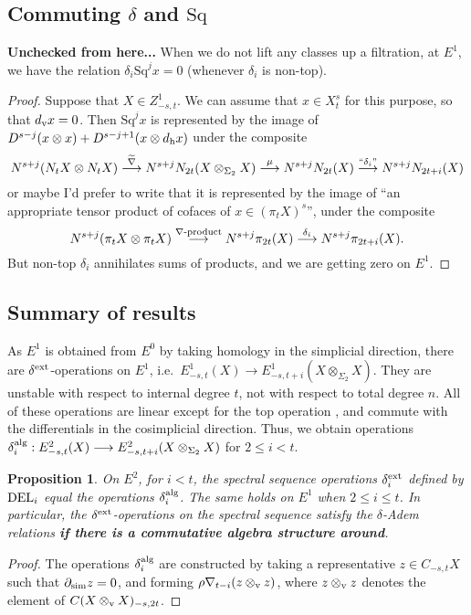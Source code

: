 \documentclass[11pt]{amsart}
\theoremstyle{plain}
\newtheorem{prop}[thm]{Proposition}
\theoremstyle{definition}
\renewcommand{\to}{\longrightarrow}
\theoremstyle{plain}
\newcommand{\Nabla}{\nabla}
\newcommand{\Sq}{\mathrm{Sq}}
\begin{document}
\begin{second quadrant homotopy}
\subsection{Commuting $\delta$ and $\Sq$}
\textbf{Unchecked from here...} 
When we do not lift any classes up a filtration, at $E^1$, we have the relation $\delta_i\Sq^jx=0$ (whenever $\delta_i$ is non-top).
\begin{proof}
Suppose that $X\in Z^1_{-s,t}$. We can assume that $x\in X^s_t$ for this purpose, so that $d_\textup{v}x=0$. Then $\Sq^jx$ is represented by the image of $D^{s-j}(x\otimes x)+D^{s-j+1}(x\otimes d_\textup{h}x)$ under the composite
\[N^{s+j}(N_tX\otimes N_tX)\overset{\widetilde{\Nabla}}{\to}N^{s+j}N_{2t}(X\otimes_{\Sigma_2} X)\overset{\mu}{\to}N^{s+j}N_{2t}(X)\overset{\textup{``$\delta_i$''}}{\to}N^{s+j}N_{2t+i}(X)\]
or maybe I'd prefer to write that it is represented by the image of ``an appropriate tensor product of cofaces of $x\in (\pi_tX)^s$'', under the composite
\[N^{s+j}(\pi_tX\otimes \pi_tX)\overset{\Nabla\textup{-product}}{\to}N^{s+j}\pi_{2t}(X)\overset{\delta_i}{\to}N^{s+j}\pi_{2t+i}(X).\]
But non-top $\delta_i$ annihilates sums of products, and we are getting zero on $E^1$.
\end{proof}

\subsection{Summary of results}

As $E^1$ is obtained from $E^0$ by taking homology in the simplicial direction, there are $\delta^\textup{ext}$-operations on $E^1$, i.e.\ $E^1_{-s,t}(X)\to E^1_{-s,t+i}(X\otimes_{\Sigma_2}X)$. They are unstable with respect to internal degree $t$, not with respect to total degree $n$. All of these operations are linear except for the top operation \cite[4.2]{DwyerHtpyOpsSimpComAlg.pdf}, and commute with the differentials in the cosimplicial direction. Thus, we obtain operations $\delta^\textup{alg}_i:E^2_{-s,t}(X)\to E^2_{-s,t+i}(X\otimes_{\Sigma_2}X)$ for $2\leq i<t$.
\begin{prop}
On $E^2$, for $i<t$, the spectral sequence operations $\delta^\textup{ext}_i$ defined by $\textup{DEL}_i$ equal the operations $\delta^\textup{alg}_i$. The same holds on $E^1$ when $2\leq i\leq t$. In particular, the $\delta^\textup{ext}$-operations on the spectral sequence satisfy the $\delta$-Adem relations \textbf{if there is a commutative algebra structure around}.
\end{prop}
\begin{proof}
The operations $\delta^\textup{alg}_i$ are constructed by taking a representative $z\in C_{-s,t}X$ such that $\partial_\textup{sim}z=0$, and forming $\rho\Nabla_{t-i}(z\otimes_\textup{v} z)$, where $z\otimes_\textup{v} z$ denotes the element of $C(X\otimes_\textup{v}X)_{-s,2t}$.


\end{proof}
\end{second quadrant homotopy}
\end{document}
